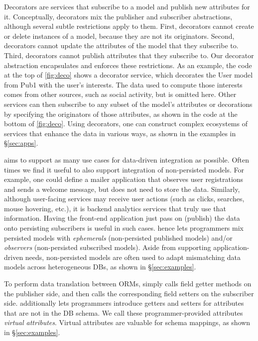Decorators are services that subscribe to a
model and publish new attributes for it.  Conceptually, decorators mix the
publisher and subscriber abstractions, although several subtle restrictions apply to them.  
First, decorators cannot create or delete instances
of a model, because they are not its originators.  Second,
decorators cannot update the attributes of the model that they subscribe
to.  Third, decorators cannot publish attributes that they subscribe to.
Our decorator \mbox{abstraction} encapsulates and enforces these 
restrictions.
As an example, the code at the top of \F\ref{fig:deco} shows a decorator
service, which decorates the User model from Pub1 with the user's interests.
The data used to compute those interests comes from other sources,
such as social activity, but is omitted here. Other services can then subscribe
to any subset of the model's attributes or decorations by specifying the
originators of those attributes, as shown in the code at the bottom of \F\ref{fig:deco}.
Using decorators, one can construct complex ecosystems of services
that enhance the data in various ways, as shown in the examples in
\S\ref{sec:apps}.

 \synapse aims to support as many use cases
for data-driven integration as possible.  Often times we find it useful to
also support integration of non-persisted models.
For example, one could define a mailer application that observes user
registrations and sends a welcome message, but does not need to store the data.
Similarly, although user-facing services may receive user actions
(such as clicks, searches, mouse hovering, etc.), it is backend analytics
services that truly use that information.  Having the front-end application just
pass on (publish) the data onto persisting subscribers is useful in such cases.
\synapse hence lets programmers mix persisted models with {\em ephemerals}
(non-persisted published models)
and/or {\em observers} (non-persisted subscribed models).  Aside from
supporting application-driven needs, non-persisted models are often used to
adapt mismatching data models across heterogeneous DBs, as shown in
\S\ref{sec:examples}.

 To perform data translation between ORMs,
\synapse simply calls field getter methods on the publisher side, and then
calls the corresponding field setters on the subscriber side. \synapse
additionally lets programmers introduce getters and setters for attributes
that are not in the DB schema.  We call these programmer-provided attributes
{\em virtual attributes}. Virtual attributes are valuable for schema mappings,
as shown in \S\ref{sec:examples}.


